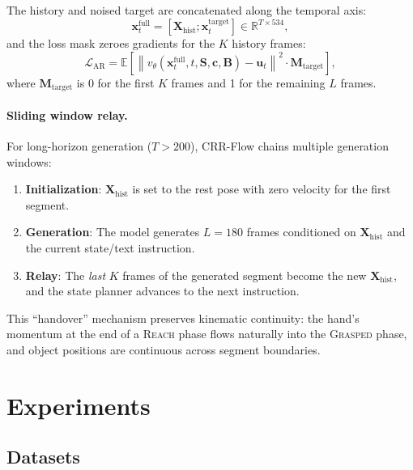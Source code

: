 The history and noised target are concatenated along the temporal axis:
\begin{equation}
    \mathbf{x}_t^{\text{full}} = [\mathbf{X}_{\text{hist}}; \mathbf{x}_t^{\text{target}}] \in \mathbb{R}^{T \times 534},
    \label{eq:autoreg_concat}
\end{equation}
and the loss mask zeroes gradients for the $K$ history frames:
\begin{equation}
    \mathcal{L}_{\text{AR}} = \mathbb{E}\left[\left\| v_\theta(\mathbf{x}_t^{\text{full}}, t, \mathbf{S}, \mathbf{c}, \mathbf{B}) - \mathbf{u}_t \right\|^2 \cdot \mathbf{M}_{\text{target}}\right],
    \label{eq:autoreg_loss}
\end{equation}
where $\mathbf{M}_{\text{target}}$ is 0 for the first $K$ frames and 1 for the remaining $L$ frames.

\paragraph{Sliding window relay.}
For long-horizon generation ($T > 200$), CRR-Flow chains multiple generation windows:
\begin{enumerate}
    \item \textbf{Initialization}: $\mathbf{X}_{\text{hist}}$ is set to the rest pose with zero velocity for the first segment.
    \item \textbf{Generation}: The model generates $L{=}180$ frames conditioned on $\mathbf{X}_{\text{hist}}$ and the current state/text instruction.
    \item \textbf{Relay}: The \emph{last} $K$ frames of the generated segment become the new $\mathbf{X}_{\text{hist}}$, and the state planner advances to the next instruction.
\end{enumerate}
This ``handover'' mechanism preserves kinematic continuity: the hand's momentum at the end of a \textsc{Reach} phase flows naturally into the \textsc{Grasped} phase, and object positions are continuous across segment boundaries.


\section{Experiments}
\label{sec:experiments}

\subsection{Datasets}
\label{sec:datasets}

